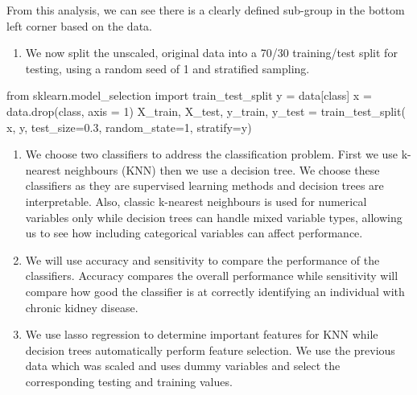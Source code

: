 \documentclass[
  11pt,
  letterpaper,
  DIV=11,
  numbers=noendperiod]{scrartcl}
\newenvironment{Shaded}{\begin{snugshade}}{\end{snugshade}}
\newcommand{\DecValTok}[1]{\textcolor[rgb]{0.68,0.00,0.00}{#1}}
\newcommand{\FloatTok}[1]{\textcolor[rgb]{0.68,0.00,0.00}{#1}}
\newcommand{\ImportTok}[1]{\textcolor[rgb]{0.00,0.46,0.62}{#1}}
\newcommand{\NormalTok}[1]{\textcolor[rgb]{0.00,0.23,0.31}{#1}}
\newcommand{\OperatorTok}[1]{\textcolor[rgb]{0.37,0.37,0.37}{#1}}
\newcommand{\StringTok}[1]{\textcolor[rgb]{0.13,0.47,0.30}{#1}}
\providecommand{\tightlist}{%
  \setlength{\itemsep}{0pt}\setlength{\parskip}{0pt}}\usepackage{longtable,booktabs,array}
\begin{document}
From this analysis, we can see there is a clearly defined sub-group in
the bottom left corner based on the data.

\begin{enumerate}
\def\labelenumi{\arabic{enumi}.}
\setcounter{enumi}{7}
\tightlist
\item
  We now split the unscaled, original data into a 70/30 training/test
  split for testing, using a random seed of 1 and stratified sampling.
\end{enumerate}

\begin{Shaded}
\begin{Highlighting}[]
\ImportTok{from}\NormalTok{ sklearn.model\_selection }\ImportTok{import}\NormalTok{ train\_test\_split}
\NormalTok{y }\OperatorTok{=}\NormalTok{ data[}\StringTok{\textquotesingle{}class\textquotesingle{}}\NormalTok{]}
\NormalTok{x }\OperatorTok{=}\NormalTok{ data.drop(}\StringTok{\textquotesingle{}class\textquotesingle{}}\NormalTok{, axis }\OperatorTok{=} \DecValTok{1}\NormalTok{)}
\NormalTok{X\_train, X\_test, y\_train, y\_test }\OperatorTok{=}\NormalTok{ train\_test\_split(}
\NormalTok{x, y, test\_size}\OperatorTok{=}\FloatTok{0.3}\NormalTok{, random\_state}\OperatorTok{=}\DecValTok{1}\NormalTok{, stratify}\OperatorTok{=}\NormalTok{y)}
\end{Highlighting}
\end{Shaded}

\begin{enumerate}
\def\labelenumi{\arabic{enumi}.}
\setcounter{enumi}{8}
\item
  We choose two classifiers to address the classification problem. First
  we use k-nearest neighbours (KNN) then we use a decision tree. We
  choose these classifiers as they are supervised learning methods and
  decision trees are interpretable. Also, classic k-nearest neighbours
  is used for numerical variables only while decision trees can handle
  mixed variable types, allowing us to see how including categorical
  variables can affect performance.
\item
  We will use accuracy and sensitivity to compare the performance of the
  classifiers. Accuracy compares the overall performance while
  sensitivity will compare how good the classifier is at correctly
  identifying an individual with chronic kidney disease.
\item
  We use lasso regression to determine important features for KNN while
  decision trees automatically perform feature selection. We use the
  previous data which was scaled and uses dummy variables and select the
  corresponding testing and training values.
\end{enumerate}
\end{document}
